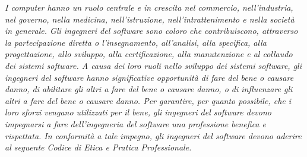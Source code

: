 \begin{center}
\begin{minipage}{0.9\textwidth}
\textit{I computer hanno un ruolo centrale e in crescita nel commercio, nell'industria, nel governo, nella medicina, nell'istruzione, nell'intrattenimento e nella società in generale. Gli ingegneri del software sono coloro che contribuiscono, attraverso la partecipazione diretta o l'insegnamento, all'analisi, alla specifica, alla progettazione, allo sviluppo, alla certificazione, alla manutenzione e al collaudo dei sistemi software. A causa dei loro ruoli nello sviluppo dei sistemi software, gli ingegneri del software hanno significative opportunità di fare del bene o causare danno, di abilitare gli altri a fare del bene o causare danno, o di influenzare gli altri a fare del bene o causare danno. Per garantire, per quanto possibile, che i loro sforzi vengano utilizzati per il bene, gli ingegneri del software devono impegnarsi a fare dell'ingegneria del software una professione benefica e rispettata. In conformità a tale impegno, gli ingegneri del software devono aderire al seguente Codice di Etica e Pratica Professionale.}
\end{minipage}
\end{center}

